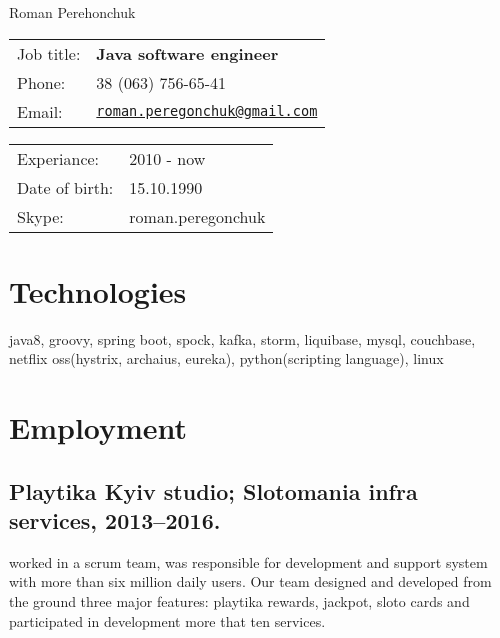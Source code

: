 \documentclass[letterpaper]{article}
\def\name{Roman Perehonchuk}
\renewenvironment{itemize}{
  \begin{list}{}{
    \setlength{\leftmargin}{1.5em}
  }
}{
  \end{list}
}
\begin{document}
{\huge \name}


\vspace{0.25in}

\begin{minipage}{0.45\linewidth}
  \begin{tabular}{ll}
    Job title: & \textbf{Java software engineer} \\
    Phone: & 38 (063) 756-65-41 \\
    Email: & \href{mailto:roman.peregonchuk@gmail.com}{\tt roman.peregonchuk@gmail.com} \\
  \end{tabular}
\end{minipage}
\begin{minipage}{0.45\linewidth}
  \begin{tabular}{ll}
    Experiance: & 2010 - now \\
    Date of birth: & 15.10.1990 \\
    Skype: & roman.peregonchuk \\
  \end{tabular}
\end{minipage}

\section*{Technologies}

\begin{itemize}
\item java8, groovy, spring boot, spock, kafka, storm, liquibase, mysql, couchbase, netflix oss(hystrix, archaius, eureka), python(scripting language), linux  
\end{itemize}

\section*{Employment}

\subsection*{Playtika Kyiv studio; Slotomania infra services, 2013--2016.}

\begin{itemize}
\item worked in a scrum team, was responsible for development and support system with more than six million daily users. Our team designed and developed from the ground three major features: playtika rewards, jackpot, sloto cards and participated in development more that ten services.  
\end{itemize}
\end{document}

